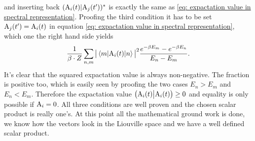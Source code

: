 %
and inserting back $({\mathrm{A}_{i}(t)}|{\mathrm{A}_{j}(t')})^{*}$ is exactly the same as \eqref{eq: expactation value in spectral representation}.
Proofing the third condition it has to be set $\mathrm{A}_{j}(t') = \mathrm{A}_{i}(t)$ in equation \eqref{eq: expactation value in spectral representation}, which one the right hand side yields
%
\begin{align}
	\frac{1}{\beta \cdot Z} \sum\limits_{n,m} \big\vert\mel{m}{\mt{A}_{i}(t)}{n}\big\vert^{2} \frac{e^{-\beta E_{m}} - e^{-\beta E_{n}}}{E_{n}-E_{m}}.
\end{align}
%
It's clear that the squared expactation value is always non-negative.
The fraction is positive too, which is easily seen by proofing the two cases $E_{n} > E_{m}$ and $E_{n} < E_{m}$.
Therefore the expactation value $\big({\mathrm{A}_{i}(t)}\big|{\mathrm{A}_{i}(t)}\big) \geq 0$ and equality is only possible if $\mathrm{A}_{i} = 0$.
All three conditions are well proven and the chosen scalar product is really one's.
At this point all the mathematical ground work is done, we know how the vectors look in the Liouville space and we have a well defined scalar product.

